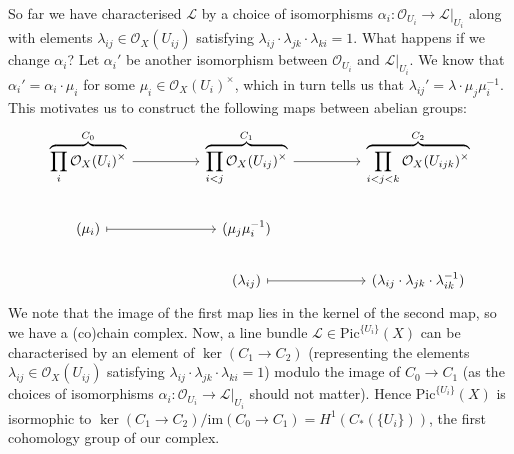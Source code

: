 So far we have characterised $\mathcal{L}$ by a choice of isomorphisms $\alpha_i: \mathcal{O}_{U_i} \to \mathcal{L}|_{U_i}$ along with elements $\lambda_{ij} \in \mathcal{O}_X(U_{ij})$ satisfying $\lambda_{ij} \cdot \lambda_{jk} \cdot \lambda_{ki} = 1$. What happens if we change $\alpha_i$? Let $\alpha_i'$ be another isomorphism between $\mathcal{O}_{U_i}$ and $\mathcal{L}|_{U_i}$. We know that $\alpha_i' = \alpha_i \cdot \mu_i$ for some $\mu_i \in \mathcal{O}_X(U_i)^\times$, which in turn tells us that $\lambda_{ij}' = \lambda \cdot \mu_j\mu_i^{-1}$. This motivates us to construct the following maps between abelian groups:
\[
\begin{tikzcd}
    \overbrace{\prod_i \mathcal{O}_X(U_i)^\times}^{C_0} && \overbrace{\prod_{i<j} \mathcal{O}_X(U_{ij})^\times}^{C_1} && \overbrace{\prod_{i<j<k} \mathcal{O}_X(U_{ijk})^\times}^{C_2} \\
    (\mu_i) && (\mu_j \mu_i^{-1}) && \\
    && (\lambda_{ij}) && (\lambda_{ij} \cdot \lambda_{jk} \cdot \lambda_{ik}^{-1})
    \arrow[maps to, from=2-1, to=2-3]
	\arrow[maps to, from=3-3, to=3-5]
    \arrow[from=1-1, to=1-3]
	\arrow[from=1-3, to=1-5]
\end{tikzcd}
\]
We note that the image of the first map lies in the kernel of the second map, so we have a (co)chain complex. Now, a line bundle $\mathcal{L} \in \mathrm{Pic}^{\{U_i\}}(X)$ can be characterised by an element of $\ker(C_1 \to C_2)$ (representing the elements $\lambda_{ij} \in \mathcal{O}_X(U_{ij})$ satisfying $\lambda_{ij} \cdot \lambda_{jk} \cdot \lambda_{ki} = 1$) modulo the image of $C_0 \to C_1$ (as the choices of isomorphisms $\alpha_i: \mathcal{O}_{U_i} \to \mathcal{L}|_{U_i}$ should not matter). Hence $\mathrm{Pic}^{\{U_i\}}(X)$ is isormophic to $\ker(C_1 \to C_2)/\mathrm{im}(C_0 \to C_1) = H^1(C_*(\{U_i\}))$, the first cohomology group of our complex. 

